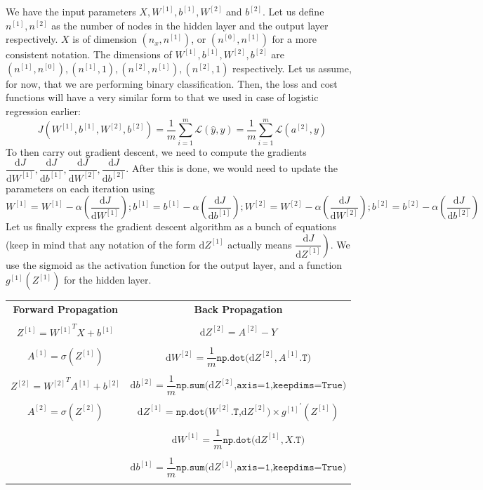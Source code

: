 \documentclass{article}[a4paper,12pt]
\theoremstyle{definition}
\newcommand{\Lagr}{\mathcal{L}}
\begin{document}
We have the input parameters $X,W^{[1]},b^{[1]},W^{[2]}$ and $b^{[2]}$. Let us define $n^{[1]},n^{[2]}$ as the number of nodes in the hidden layer and the output layer respectively. $X$ is of dimension $(n_x,n^{[1]})$, or $(n^{[0]},n^{[1]})$ for a more consistent notation. The dimensions of 
$W^{[1]},b^{[1]},W^{[2]},b^{[2]}$ are $(n^{[1]},n^{[0]}),(n^{[1]},1),(n^{[2]},n^{[1]}),(n^{[2]},1)$ respectively. Let us assume, for now, that we are performing binary classification. Then, the loss and cost functions will have a very similar form to that we used in case of logistic regression earlier:
$$J(W^{[1]},b^{[1]},W^{[2]},b^{[2]})=\frac{1}{m}\sum_{i=1}^m\Lagr(\hat{y},y)=\frac{1}{m}\sum_{i=1}^m\Lagr(a^{[2]},y)$$
To then carry out gradient descent, we need to compute the gradients $\dfrac{\text{d}J}{\text{d}W^{[1]}},\dfrac{\text{d}J}{\text{d}b^{[1]}},\dfrac{\text{d}J}{\text{d}W^{[2]}},\dfrac{\text{d}J}{\text{d}b^{[2]}}$. After this is done, we would need to update the parameters on each iteration using $$W^{[1]}=W^{[1]}-\alpha\left(\dfrac{\text{d}J}{\text{d}W^{[1]}}\right);b^{[1]}=b^{[1]}-\alpha\left(\dfrac{\text{d}J}{\text{d}b^{[1]}}\right);W^{[2]}=W^{[2]}-\alpha\left(\dfrac{\text{d}J}{\text{d}W^{[2]}}\right);b^{[2]}=b^{[2]}-\alpha\left(\dfrac{\text{d}J}{\text{d}b^{[2]}}\right)$$
Let us finally express the gradient descent algorithm as a bunch of equations (keep in mind that any notation of the form $\text{d}Z^{[1]}$ actually means $\left.\dfrac{\text{d}J}{\text{d}Z^{[1]}}\right)$. We use the sigmoid as the activation function for the output layer, and a function $g^{[1]}(Z^{[1]})$ for the hidden layer.
\begin{center}
\begin{tabular}{c|c}
	\textbf{Forward Propagation} & \textbf{Back Propagation}\\\\	
	$Z^{[1]}={W^{[1]}}^TX+b^{[1]}$ & $\text{d}Z^{[2]}=A^{[2]}-Y$\\\\
	$A^{[1]}=\sigma(Z^{[1]})$ & $\text{d}W^{[2]}=\dfrac{1}{m}\texttt{np.dot(}\text{d}Z^{[2]},{A^{[1]}}\texttt{.T)}$\\\\
	$Z^{[2]}={W^{[2]}}^TA^{[1]}+b^{[2]}$ & $\text{d}b^{[2]}=\dfrac{1}{m}\texttt{np.sum(}\text{d}Z^{[2]}\texttt{,axis=1,keepdims=True)}$\\\\
	$A^{[2]}=\sigma(Z^{[2]})$ & $\text{d}Z^{[1]}=\texttt{np.dot(}W^{[2]}\texttt{.T,}\text{d}Z^{[2]}\texttt{)}\times{g^{[1]}}^{\prime}(Z^{[1]})$\\\\
	 & $\text{d}W^{[1]}=\dfrac{1}{m}\texttt{np.dot(}\text{d}Z^{[1]},X\texttt{.T)}$\\\\
	  & $\text{d}b^{[1]}=\dfrac{1}{m}\texttt{np.sum(}\text{d}Z^{[1]}\texttt{,axis=1,keepdims=True)}$\\\\
\end{tabular}
\end{center}
\end{document}
